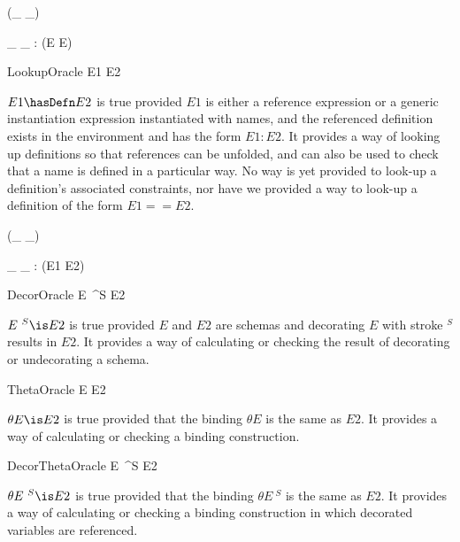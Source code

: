\begin{zed}
  \relation (\_ \hasDefn \_)
\end{zed}

\begin{gendef}[E]
  \_ \hasDefn \_ : \power (E \cross E)
\end{gendef}

\begin{zedoracle}{LookupOracle}
  E1 \hasDefn E2
\end{zedoracle}
$E1 \hasDefn E2$ is true provided $E1$ is either a reference expression
or a generic instantiation expression instantiated with names,
and the referenced definition exists in the environment
and has the form $E1 : E2$.
It provides a way of looking up definitions so that references can be unfolded,
and can also be used to check that a name is defined in a particular way.
No way is yet provided to look-up a definition's associated constraints,
nor have we provided a way to look-up a definition of the form $E1 == E2$.


\begin{zed}
  \relation (\_ \is \_)
\end{zed}

\begin{gendef}[E1,E2]
  \_ \is \_ : \power (E1 \cross E2)
\end{gendef}

\begin{zedoracle}{DecorOracle}
  E~{}^S \is E2
\end{zedoracle}
$E~{}^S \is E2$ is true provided $E$ and $E2$ are schemas and
decorating $E$ with stroke ${}^S$ results in $E2$.
It provides a way of calculating or checking the result of 
decorating or undecorating a schema.

\begin{zedoracle}{ThetaOracle}
  \theta E \is E2
\end{zedoracle}
$\theta E \is E2$ is true provided that the binding $\theta E$
is the same as $E2$.
It provides a way of calculating or checking a binding construction.

\begin{zedoracle}{DecorThetaOracle}
  \theta E~{}^S \is E2
\end{zedoracle}
$\theta E~{}^S \is E2$ is true provided that the binding $\theta E~{}^S$
is the same as $E2$.
It provides a way of calculating or checking a binding construction
in which decorated variables are referenced.

